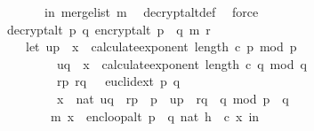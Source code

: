 \begin{isabellebody}
\ \ \ \ \ \ \ in\ merge{\isacharunderscore}{\kern0pt}list\ m{\isacharparenright}{\kern0pt}{\isachardoublequoteclose}\ \isamarkupfalse%
\ decrypt{\isacharunderscore}{\kern0pt}alt{\isacharunderscore}{\kern0pt}def\ \isamarkupfalse%
\ force\isanewline
\isanewline
\ \ \isamarkupfalse%
\ \isamarkupfalse%
\ {\isachardoublequoteopen}decrypt{\isacharunderscore}{\kern0pt}alt\ p\ q\ {\isacharparenleft}{\kern0pt}encrypt{\isacharunderscore}{\kern0pt}alt\ {\isacharparenleft}{\kern0pt}p\ {\isacharasterisk}{\kern0pt}\ q{\isacharparenright}{\kern0pt}\ m\ r{\isacharparenright}{\kern0pt}\ {\isacharequal}{\kern0pt}\ \isanewline
\ \ \ \ {\isacharparenleft}{\kern0pt}let\ u{\isacharunderscore}{\kern0pt}p\ {\isacharequal}{\kern0pt}\ x\ {\isacharcircum}{\kern0pt}\ {\isacharparenleft}{\kern0pt}calculate{\isacharunderscore}{\kern0pt}exponent\ {\isacharparenleft}{\kern0pt}length\ c{\isacharparenright}{\kern0pt}\ p{\isacharparenright}{\kern0pt}\ mod\ p{\isacharsemicolon}{\kern0pt}\isanewline
\ \ \ \ \ \ \ \ \ u{\isacharunderscore}{\kern0pt}q\ {\isacharequal}{\kern0pt}\ x\ {\isacharcircum}{\kern0pt}\ {\isacharparenleft}{\kern0pt}calculate{\isacharunderscore}{\kern0pt}exponent\ {\isacharparenleft}{\kern0pt}length\ c{\isacharparenright}{\kern0pt}\ q{\isacharparenright}{\kern0pt}\ mod\ q{\isacharsemicolon}{\kern0pt}\isanewline
\ \ \ \ \ \ \ \ \ {\isacharparenleft}{\kern0pt}{\isacharparenleft}{\kern0pt}r{\isacharunderscore}{\kern0pt}p{\isacharcomma}{\kern0pt}\ r{\isacharunderscore}{\kern0pt}q{\isacharparenright}{\kern0pt}{\isacharcomma}{\kern0pt}\ {\isacharunderscore}{\kern0pt}{\isacharparenright}{\kern0pt}\ {\isacharequal}{\kern0pt}\ euclid{\isacharunderscore}{\kern0pt}ext\ p\ q{\isacharsemicolon}{\kern0pt}\ \isanewline
\ \ \ \ \ \ \ \ \ x{\isacharunderscore}{\kern0pt}{}\ {\isacharequal}{\kern0pt}\ nat\ {\isacharparenleft}{\kern0pt}{\isacharparenleft}{\kern0pt}u{\isacharunderscore}{\kern0pt}q\ {\isacharasterisk}{\kern0pt}\ r{\isacharunderscore}{\kern0pt}p\ {\isacharasterisk}{\kern0pt}\ p\ {\isacharplus}{\kern0pt}\ u{\isacharunderscore}{\kern0pt}p\ {\isacharasterisk}{\kern0pt}\ r{\isacharunderscore}{\kern0pt}q\ {\isacharasterisk}{\kern0pt}\ q{\isacharparenright}{\kern0pt}\ mod\ {\isacharparenleft}{\kern0pt}p\ {\isacharasterisk}{\kern0pt}\ q{\isacharparenright}{\kern0pt}{\isacharparenright}{\kern0pt}{\isacharsemicolon}{\kern0pt}\isanewline
\ \ \ \ \ \ \ \ {\isacharparenleft}{\kern0pt}m{\isacharcomma}{\kern0pt}\ x{\isacharprime}{\kern0pt}{\isacharparenright}{\kern0pt}\ {\isacharequal}{\kern0pt}\ enc{\isacharunderscore}{\kern0pt}loop{\isacharunderscore}{\kern0pt}alt\ {\isacharparenleft}{\kern0pt}p\ {\isacharasterisk}{\kern0pt}\ q{\isacharcomma}{\kern0pt}\ {\isacharparenleft}{\kern0pt}nat\ h{\isacharparenright}{\kern0pt}\ {\isacharcomma}{\kern0pt}\ c{\isacharparenright}{\kern0pt}\ x{\isacharunderscore}{\kern0pt}{}\ in\isanewline

\end{isabellebody}
